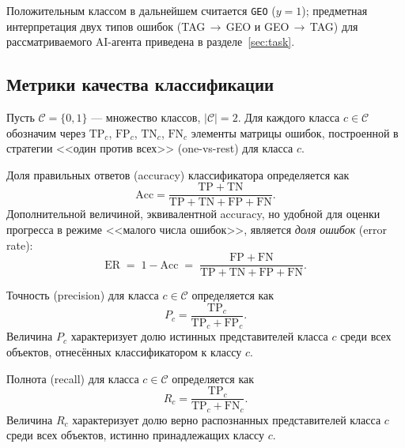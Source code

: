 Положительным классом в дальнейшем считается \texttt{GEO} ($y = 1$);
предметная интерпретация двух типов ошибок (TAG\,$\to$\,GEO и GEO\,$\to$\,TAG)
для рассматриваемого AI-агента приведена в разделе~\ref{sec:task}.


\subsection{Метрики качества классификации}
\label{subsec:metrics}

Пусть $\mathcal{C} = \{0, 1\}$ --- множество классов,
$|\mathcal{C}| = 2$. Для каждого класса $c \in \mathcal{C}$ обозначим
через $\mathrm{TP}_c$, $\mathrm{FP}_c$, $\mathrm{TN}_c$, $\mathrm{FN}_c$
элементы матрицы ошибок, построенной в стратегии <<один против всех>>
(one-vs-rest) для класса $c$.

\begin{definition}
\label{def:accuracy}
Доля правильных ответов (accuracy) классификатора определяется как
\begin{equation}
    \mathrm{Acc} = \frac{\mathrm{TP} + \mathrm{TN}}
                        {\mathrm{TP} + \mathrm{TN} + \mathrm{FP} + \mathrm{FN}}.
    \label{eq:accuracy}
\end{equation}
Дополнительной величиной, эквивалентной accuracy, но удобной для оценки
прогресса в режиме <<малого числа ошибок>>, является \emph{доля ошибок}
(error rate):
\begin{equation}
    \mathrm{ER} \;=\; 1 - \mathrm{Acc}
                  \;=\; \frac{\mathrm{FP} + \mathrm{FN}}
                             {\mathrm{TP} + \mathrm{TN} + \mathrm{FP} + \mathrm{FN}}.
    \label{eq:error-rate}
\end{equation}
\end{definition}

\begin{definition}[Precision]
\label{def:precision}
Точность (precision) для класса $c \in \mathcal{C}$ определяется как
\begin{equation}
    P_c = \frac{\mathrm{TP}_c}{\mathrm{TP}_c + \mathrm{FP}_c}.
    \label{eq:precision}
\end{equation}
Величина $P_c$ характеризует долю истинных представителей класса $c$
среди всех объектов, отнесённых классификатором к классу $c$.
\end{definition}

\begin{definition}[Recall]
\label{def:recall}
Полнота (recall) для класса $c \in \mathcal{C}$ определяется как
\begin{equation}
    R_c = \frac{\mathrm{TP}_c}{\mathrm{TP}_c + \mathrm{FN}_c}.
    \label{eq:recall}
\end{equation}
Величина $R_c$ характеризует долю верно распознанных представителей
класса $c$ среди всех объектов, истинно принадлежащих классу $c$.
\end{definition}

